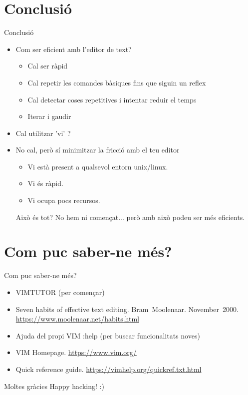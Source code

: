 \documentclass{beamer}
\begin{document}


\section{Conclusió}
    \begin{frame}{Conclusió}
        \begin{itemize}
            \item Com ser eficient amb l'editor de text?
                \begin{itemize}
                    \item <2-> Cal ser ràpid
                    \item <3-> Cal repetir les comandes bàsiques fins que siguin un reflex
                    \item <4-> Cal detectar coses repetitives i intentar reduir el temps
                    \item <5-> Iterar i gaudir
                \end{itemize}
            \item <6->Cal utilitzar 'vi' ?
            \item <7->No cal, però sí minimitzar la fricció amb el teu editor
                \begin{itemize}
                    \item Vi està present a qualsevol entorn unix/linux.
                    \item Vi és ràpid.
                    \item Vi ocupa pocs recursos.
                \end{itemize}
                \begin{block}{Això és tot?}
                    No hem ni començat... però amb això podeu ser més eficients.
                \end{block}
        \end{itemize}
    \end{frame}

\section{Com puc saber-ne més?}
    \begin{frame}{Com puc saber-ne més?}
        \begin{itemize}
            \item VIMTUTOR (per començar)
            \item Seven habits of effective text editing. Bram~Moolenaar. November~2000. \url{https://www.moolenaar.net/habits.html}
            \item Ajuda del propi VIM \alert{:help} (per buscar funcionalitats noves)
            \item VIM Homepage. \url{https://www.vim.org/}
            \item Quick reference guide. \url{https://vimhelp.org/quickref.txt.html}
        \end{itemize}

    \end{frame}

\begin{frame}{Moltes gràcies}
    Happy hacking! :)
\end{frame}

\begin{frame}
    \titlepage
\end{frame}
\end{document}
